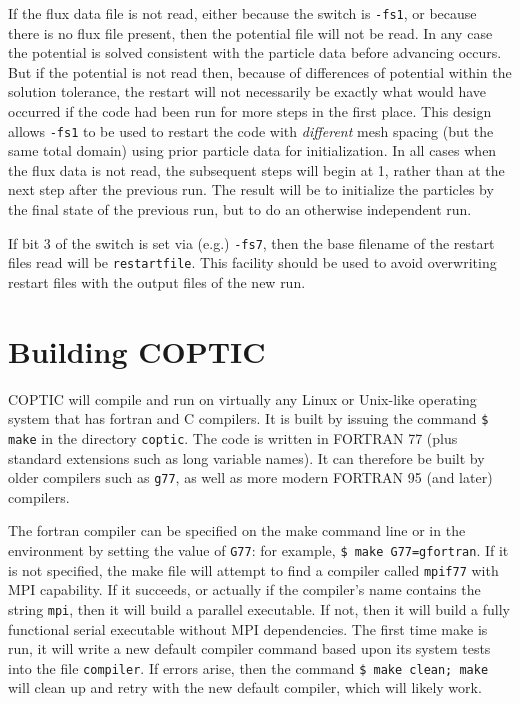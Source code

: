 \documentclass[12pt]{article}
\begin{document}
If the flux data file is not read, either because the switch is
\verb!-fs1!, or because there is no flux file present, then the
potential file will not be read. In any case the potential is solved
consistent with the particle data before advancing occurs. But if the
potential is not read then, because of differences of potential
within the solution tolerance, the restart will not necessarily be exactly
what would have occurred if the code had been run for more steps in
the first place. This design allows \verb!-fs1! to be used to
restart the code with \emph{different} mesh spacing (but the same
total domain) using prior particle data for initialization.  In all
cases when the flux data is not read, the subsequent steps will begin
at 1, rather than at the next step after the previous run. The result
will be to initialize the particles by the final state of the
previous run, but to do an otherwise independent run.

If bit 3 of the switch is set via (e.g.) \verb!-fs7!, then the base
filename of the restart files read will be \verb!restartfile!. This
facility should be used to avoid overwriting restart files with the
output files of the new run.

\section{Building COPTIC}\label{building}

COPTIC will compile and run on virtually any Linux or Unix-like
operating system that has fortran and C compilers. It is built by
issuing the command \verb!$ make! in the directory \verb!coptic!. The
code is written in FORTRAN 77 (plus standard extensions such as long
variable names). It can therefore be built by older compilers such as
\verb!g77!, as well as more modern FORTRAN 95 (and later) compilers.

The fortran compiler can be specified on the make command line or in
the environment by setting the value of \verb!G77!: for example,
\verb!$ make G77=gfortran!.  If it is not specified, the make file
will attempt to find a compiler called \verb!mpif77! with MPI
capability.  If it succeeds, or actually if the compiler's name
contains the string \verb!mpi!, then it will build a parallel
executable. If not, then it will build a fully functional serial
executable without MPI dependencies. The first time make is run, it
will write a new default compiler command based upon its system tests
into the file \verb!compiler!. If errors arise, then the command
\verb!$ make clean; make! will clean up and retry with the new default
compiler, which will likely work.
\end{document}
